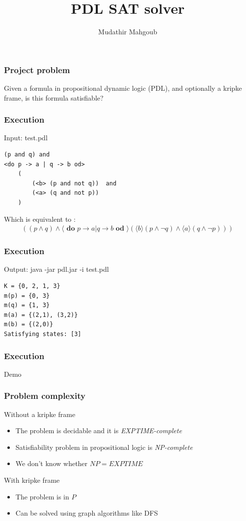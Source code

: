 \documentclass{beamer}
\title{PDL SAT solver}
\author{Mudathir Mahgoub}
\begin{document}
 
\frame{\titlepage}
 
\begin{frame}
\frametitle{Project problem}
Given a formula in propositional dynamic logic (PDL), and optionally a kripke frame, is this formula satisfiable?
\end{frame}

\begin{frame}[fragile]
\frametitle{Execution}
\scriptsize

\begin{block}{Input: test.pdl}
\begin{verbatim}
(p and q) and
<do p -> a | q -> b od>
    (
        (<b> (p and not q))  and
        (<a> (q and not p))
    )
\end{verbatim}
Which is equivalent to :
\begin{align*}
((p \wedge q) \wedge \langle\textbf{ do }p \rightarrow a \vert q \rightarrow b\textbf{ od }\rangle(\langle b\rangle(p \wedge \neg q) \wedge \langle a \rangle(q \wedge \neg p)))
\end{align*}
\end{block}
\end{frame}


\begin{frame}[fragile]
\frametitle{Execution}
\begin{block} {Output: java -jar pdl.jar -i test.pdl}
\small
\begin{lstlisting} 
K = {0, 2, 1, 3}
m(p) = {0, 3}
m(q) = {1, 3}
m(a) = {(2,1), (3,2)}
m(b) = {(2,0)}
Satisfying states: [3]
\end{lstlisting} 
\end{block}
\end{frame}

\begin{frame}[fragile]
\frametitle{Execution}
\huge
\centering

Demo

\end{frame}

\begin{frame}[fragile]
\frametitle{Problem complexity}
\begin{block}{Without a kripke frame}
\begin{itemize}
\item The problem is decidable and it is \textit{EXPTIME-complete}
\item Satisfiability problem in propositional logic is \textit{NP-complete}
\item We don't know whether $NP = EXPTIME$
 \vfill 
\end{itemize}

 \vfill 

\end{block}
\begin{block}{With kripke frame}
\begin{itemize}
\item The problem is in $P$
\item Can be solved using graph algorithms like DFS
\end{itemize}
\end{block}
\end{frame}
\end{document}
